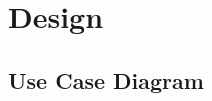 \documentclass{article}
\newcommand{\namedlisting}[2][]{%
}
\newcommand*\lstinputpath[1]{\lstset{inputpath=#1}}
\begin{document}
\newpage
\tableofcontents

\newpage
{}



% 
% 
% 
% 
% 
% 
% 
% 
% 
% 
% 
% 
% 
% 
% 

\section{Design}

\subsection{Use Case Diagram}
  
\end{document}

